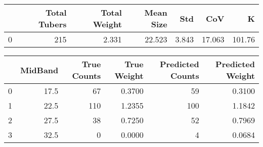 \begin{tabular}{lrrrrrr}
\toprule
{} &  Total Tubers &  Total Weight &  Mean Size &    Std &     CoV &       K \\
\midrule
0 &           215 &         2.331 &     22.523 &  3.843 &  17.063 &  101.76 \\
\bottomrule
\end{tabular}

\begin{tabular}{lrrrrr}
\toprule
{} &  MidBand &  True Counts &  True Weight &  Predicted Counts &  Predicted Weight \\
\midrule
0 &     17.5 &           67 &       0.3700 &                59 &            0.3100 \\
1 &     22.5 &          110 &       1.2355 &               100 &            1.1842 \\
2 &     27.5 &           38 &       0.7250 &                52 &            0.7969 \\
3 &     32.5 &            0 &       0.0000 &                 4 &            0.0684 \\
\bottomrule
\end{tabular}

